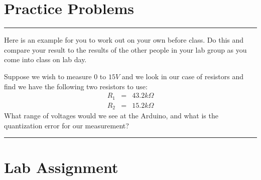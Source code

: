 \section{Practice Problems}

\rule{11cm}{0.03cm}

Here is an example for you to work out on your own before class. Do this and
compare your result to the results of the other people in your lab group as
you come into class on lab day.

Suppose we wish to measure $0$ to $15\unit{V}$ and we look in our case of
resistors and find we have the following two resistors to use:%
\begin{eqnarray*}
R_{1} &=&43.2\unit{k%
\Omega%
} \\
R_{2} &=&15.2\unit{k%
\Omega%
}
\end{eqnarray*}%
What range of voltages would we see at the Arduino, and what is the
quantization error for our measurement?

\rule{11cm}{0.03cm}

\section{Lab Assignment}

